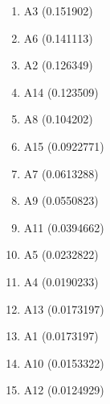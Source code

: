 \begin{enumerate}
\item A3 (0.151902)
\item A6 (0.141113)
\item A2 (0.126349)
\item A14 (0.123509)
\item A8 (0.104202)
\item A15 (0.0922771)
\item A7 (0.0613288)
\item A9 (0.0550823)
\item A11 (0.0394662)
\item A5 (0.0232822)
\item A4 (0.0190233)
\item A13 (0.0173197)
\item A1 (0.0173197)
\item A10 (0.0153322)
\item A12 (0.0124929)
\end{enumerate}